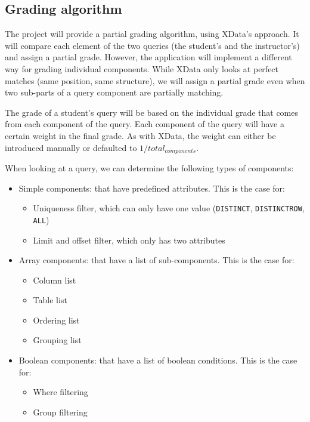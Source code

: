 \subsection{Grading algorithm}

The project will provide a partial grading algorithm, using XData's approach. It will compare each element of the two queries (the student's and the instructor's) and assign a partial grade. However, the application will implement a different way for grading individual components. While XData only looks at perfect matches (same position, same structure), we will assign a partial grade even when two sub-parts of a query component are partially matching.

The grade of a student's query will be based on the individual grade that comes from each component of the query. Each component of the query will have a certain weight in the final grade. As with XData, the weight can either be introduced manually or defaulted to $1 / total_{components}$.

When looking at a query, we can determine the following types of components:

\begin{itemize}
    \item Simple components: that have predefined attributes. This is the case for:
        \begin{itemize}
            \item Uniqueness filter, which can only have one value (\texttt{DISTINCT}, \texttt{DISTINCTROW}, \texttt{ALL})
            \item Limit and offset filter, which only has two attributes
        \end{itemize}
    \item Array components: that have a list of sub-components. This is the case for:
        \begin{itemize}
            \item Column list
            \item Table list
            \item Ordering list
            \item Grouping list
        \end{itemize}
    \item Boolean components: that have a list of boolean conditions. This is the case for:
        \begin{itemize}
            \item Where filtering
            \item Group filtering
        \end{itemize}
\end{itemize}

